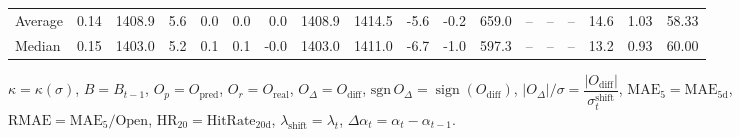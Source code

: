 \begin{threeparttable}
{\begin{tabular}{lrrrrrrrrrrrrrrrrr}
Average &     0.14 & 1408.9 &               5.6 &               0.0 &                0.0 &                0.0 & 1408.9 & 1414.5 &       -5.6 &                     -0.2 &               659.0 &         -- &        -- &             -- &             14.6 &            1.03 &                  58.33 \\
 Median &     0.15 & 1403.0 &               5.2 &               0.1 &                0.1 &               -0.0 & 1403.0 & 1411.0 &       -6.7 &                     -1.0 &               597.3 &         -- &        -- &             -- &             13.2 &            0.93 &                  60.00 \\
\bottomrule
\end{tabular}
}
\begin{tablenotes}\footnotesize
\item $\kappa=\kappa(\sigma)$, $B=B_{t-1}$, $O_p=O_{\text{pred}}$, $O_r=O_{\text{real}}$, $O_\Delta=O_{\text{diff}}$, $\mathrm{sgn}\,O_\Delta=\operatorname{sign}(O_{\text{diff}})$, $|O_\Delta|/\sigma=\dfrac{|O_{\text{diff}}|}{\sigma_t^{\text{shift}}}$, $\mathrm{MAE}_5=\mathrm{MAE}_{5\text{d}}$, $\mathrm{RMAE}= \mathrm{MAE}_5 / \text{Open}$, $\mathrm{HR}_{20}=\mathrm{HitRate}_{20\text{d}}$, 
$\lambda_{\text{shift}}=\lambda_t$, 
$\Delta\alpha_t=\alpha_t-\alpha_{t-1}$.
\end{tablenotes}
\end{threeparttable}
\endgroup

